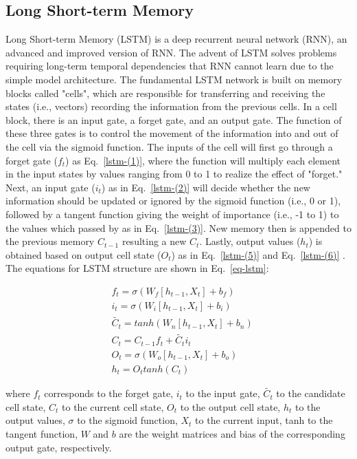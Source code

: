 \subsection{Long Short-term Memory}
Long Short-term Memory (LSTM) is a deep recurrent neural network (RNN), an advanced and improved version of RNN. The advent of LSTM solves problems requiring long-term temporal dependencies that RNN cannot learn due to the simple model architecture. The fundamental LSTM network is built on memory blocks called "cells", which are responsible for transferring and receiving the states (i.e., vectors) recording the information from the previous cells. In a cell block, there is an input gate, a forget gate, and an output gate. The function of these three gates is to control the movement of the information into and out of the cell via the sigmoid function. The inputs of the cell will first go through a forget gate ($f_t$) as Eq.~\ref{lstm-(1)}, where the function will multiply each element in the input states by values ranging from 0 to 1 to realize the effect of "forget." Next, an input gate ($i_t$) as in Eq.~\ref{lstm-(2)} will decide whether the new information should be updated or ignored by the sigmoid function (i.e., 0 or 1), followed by a tangent function giving the weight of importance (i.e., -1 to 1) to the values which passed by as in Eq.~\ref{lstm-(3)}. New memory then is appended to the previous memory $C_{t-1}$ resulting a new $C_t$. Lastly, output values ($h_t$) is obtained based on output cell state ($O_t$) as in Eq.~\ref{lstm-(5)} and Eq.~\ref{lstm-(6)} \citep{leApplicationLongShortTerm2019}. The equations for LSTM structure are shown in Eq.~\ref{eq-lstm}:

\begin{subequations} \label{eq-lstm}
  \begin{align}
      &f_t=\sigma(W_f[h_{t-1},X_t]+b_f) \label{lstm-(1)}\\
      &i_t=\sigma(W_i[h_{t-1},X_t]+b_i) \label{lstm-(2)}\\
      &\tilde{C_t}=tanh(W_n[h_{t-1},X_t]+b_n) \label{lstm-(3)}\\
      &C_t=C_{t-1}f_t+\tilde{C_t}i_t \label{lstm-(4)}\\
      &O_t=\sigma(W_o[h_{t-1},X_t]+b_o) \label{lstm-(5)}\\
      &h_t=O_ttanh(C_t) \label{lstm-(6)}
  \end{align}
\end{subequations}

\noindent
where $f_t$ corresponds to the forget gate, $i_t$ to the input gate, $\tilde{C_t}$ to the candidate cell state, $C_t$ to the current cell state, $O_t$ to the output cell state, $h_t$ to the output values, $\sigma$ to the sigmoid function, $X_t$ to the current input, tanh to the tangent function, $W$ and $b$ are the weight matrices and bias of the corresponding output gate, respectively.

